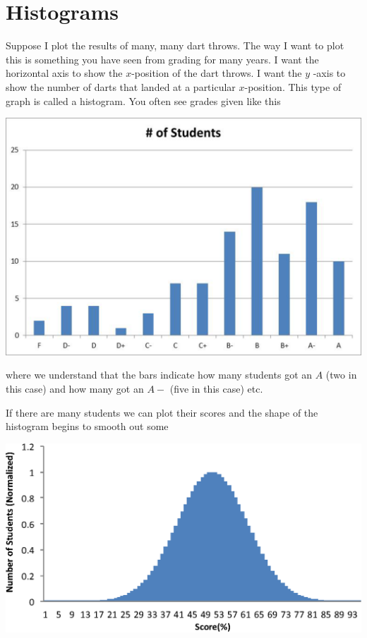\documentclass[twoside,11pt,ShortChapTitles]{BYUTextbook}
\begin{document}
\section{Histograms}

Suppose I plot the results of many, many dart throws. The way I want to
plot this is something you have seen from grading for many years. I want the
horizontal axis to show the $x$-position of the dart throws. I want the $y$%
-axis to show the number of darts that landed at a particular $x$-position.
This type of graph is called a histogram. You often see grades given like
this

\begin{center}
\includegraphics[scale=0.5]{Lab2_figs/hist_few.eps}
\end{center}

where we understand that the bars
indicate how many students got an $A$ (two in this case) and how many got an
$A-$ (five in this case) etc.

If there are many students we can plot their scores and the shape of the
histogram begins to smooth out some

\begin{center}
\includegraphics[scale=0.5]{Lab2_figs/hist_many.eps}
\end{center}
\end{document}
